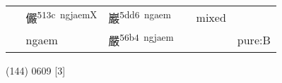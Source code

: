 \documentclass[14pt,a4paper]{scrartcl}
\begin{document}
\begin{longtable}[c]{@{}llllll@{}}
\begin{minipage}[t]{0.14\columnwidth}
\strut\end{minipage} &
\begin{minipage}[t]{0.14\columnwidth}\raggedright\strut
儼\textsuperscript{513c~ngjaemX}
\strut\end{minipage} &
\begin{minipage}[t]{0.14\columnwidth}\raggedright\strut
巖\textsuperscript{5dd6~ngaem}
\strut\end{minipage} &
\begin{minipage}[t]{0.14\columnwidth}\raggedright\strut
\strut\end{minipage} &
\begin{minipage}[t]{0.14\columnwidth}\raggedright\strut
mixed
\strut\end{minipage}\tabularnewline
\begin{minipage}[t]{0.14\columnwidth}\raggedright\strut
𠪘
\strut\end{minipage} &
\begin{minipage}[t]{0.14\columnwidth}\raggedright\strut
ngaem
\strut\end{minipage} &
\begin{minipage}[t]{0.14\columnwidth}\raggedright\strut
嚴\textsuperscript{56b4~ngjaem}
\strut\end{minipage} &
\begin{minipage}[t]{0.14\columnwidth}\raggedright\strut
\strut\end{minipage} &
\begin{minipage}[t]{0.14\columnwidth}\raggedright\strut
\strut\end{minipage} &
\begin{minipage}[t]{0.14\columnwidth}\raggedright\strut
pure:B
\strut\end{minipage}\tabularnewline
\bottomrule
\end{longtable}

(144) 0609 {[}3{]}
\end{document}

